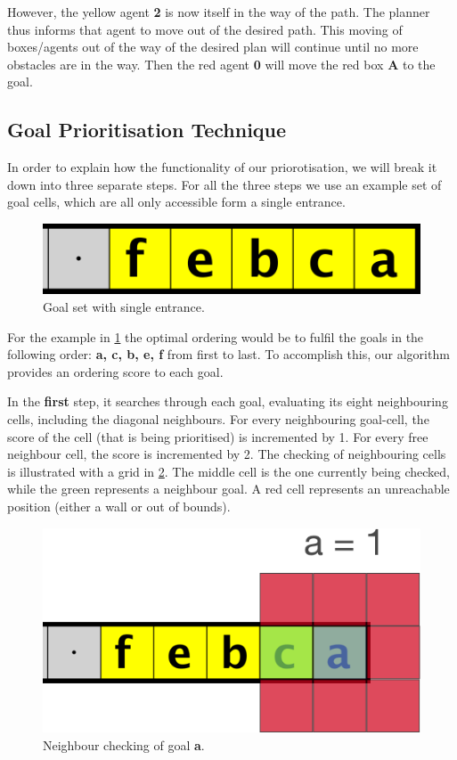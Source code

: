 However, the yellow agent \textbf{2} is now itself in the way of the path.
The planner thus informs that agent to move out of the desired path.
This moving of boxes/agents out of the way of the desired plan will continue until no more obstacles are in the way.
Then the red agent \textbf{0} will move the red box \textbf{A} to the goal.

\subsection{Goal Prioritisation Technique}
\label{methods:goal_ordering}

In order to explain how the functionality of our priorotisation, we will break it down into three separate steps. For all the three steps we use an example set of goal cells, which are all only accessible form a single entrance. 

\begin{figure}[h!]
  \centering
  \includegraphics[width=.5\columnwidth]{graphics/ie_level.png}
  \caption{\label{fig:sample}Goal set with single entrance.}
\end{figure}

For the example in \cref{fig:sample} the optimal ordering would be to fulfil the goals in the following order: \textbf{a, c, b, e, f} from first to last. 
To accomplish this, our algorithm provides an ordering score to each goal. 

In the \textbf{first} step, it searches through each goal, evaluating its eight neighbouring cells, including the diagonal neighbours. 
For every neighbouring goal-cell, the score of the cell (that is being prioritised) is incremented by 1.
For every free neighbour cell, the score is incremented by 2. 
The checking of neighbouring cells is illustrated with a grid in \cref{fig:grid1}. 
The middle cell is the one currently being checked, while the green represents a neighbour goal. 
A red cell represents an unreachable position (either a wall or out of bounds).

\begin{figure}[ht!]
  \centering
  \includegraphics[width=.5\columnwidth]{graphics/goal_pri_1.png}
  \caption{\label{fig:grid1}Neighbour checking of goal \textbf{a}.}
\end{figure}


